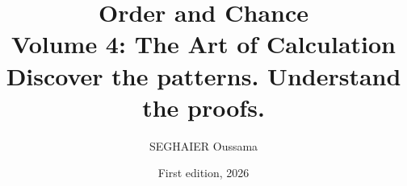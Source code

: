 \documentclass[11pt,openany]{book}
\title{\Huge\textbf{Order and Chance}\\[0.4em]\LARGE Volume 4: The Art of Calculation\\[0.6em]
\Large Discover the patterns. Understand the proofs.}
\author{SEGHAIER Oussama}
\date{First edition, 2026}
\begin{document}
\frontmatter
\makecover
\maketitle

\tableofcontents

\mainmatter













\end{document}
